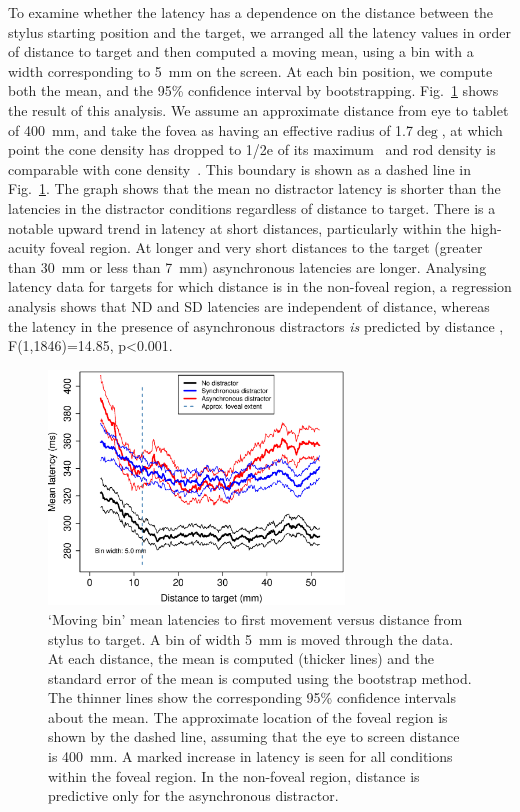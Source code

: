 \documentclass[10pt,letterpaper]{article}
\begin{document}
To examine whether the latency has a dependence on the distance
between the stylus starting position and the target, we arranged all
the latency values in order of distance to target and then computed a
moving mean, using a bin with a width corresponding to 5~mm on the
screen. At each bin position, we compute both the mean, and the 95\%
confidence interval by bootstrapping. Fig.~\ref{latvsdist} shows the
result of this analysis. We assume an approximate distance from eye to
tablet of 400~mm, and take the fovea as having an effective radius of
1.7$\deg$, at which point the cone density has dropped to 1/2e of its
maximum~\cite{hirsch_spatial_1989} and rod density is comparable with
cone density~\cite{jonas_count_1992}. This boundary is shown as a
dashed line in Fig.~\ref{latvsdist}. The graph shows that the mean no
distractor latency is shorter than the latencies in the distractor
conditions regardless of distance to target. There is a notable upward
trend in latency at short distances, particularly within the
high-acuity foveal region. At longer and very short distances to the
target (greater than 30~mm or less than 7~mm) asynchronous latencies
are longer. Analysing latency data for targets for which distance is
in the non-foveal region, a regression analysis shows that ND and SD
latencies are independent of distance, whereas the latency in the
presence of asynchronous distractors \emph{is} predicted by distance
, F(1,1846)=14.85, p\textless0.001.

\begin{figure}[htb!]
\centering
\includegraphics[width=0.7\textwidth]{./figures/movingbin_latvsdist.eps}
\caption[Mean latencies vs. distance] {`Moving bin' mean latencies to
  first movement versus distance from stylus to target. A bin of width
  5~mm is moved through the data. At each distance, the mean is
  computed (thicker lines) and the standard error of the mean is
  computed using the bootstrap method. The thinner lines show the
  corresponding 95\% confidence intervals about the mean. The
  approximate location of the foveal region is shown by the dashed
  line, assuming that the eye to screen distance is 400~mm. A marked
  increase in latency is seen for all conditions within the foveal
  region. In the non-foveal region, distance is predictive only for
  the asynchronous distractor.}
\label{latvsdist}
\end{figure}
\end{document}

